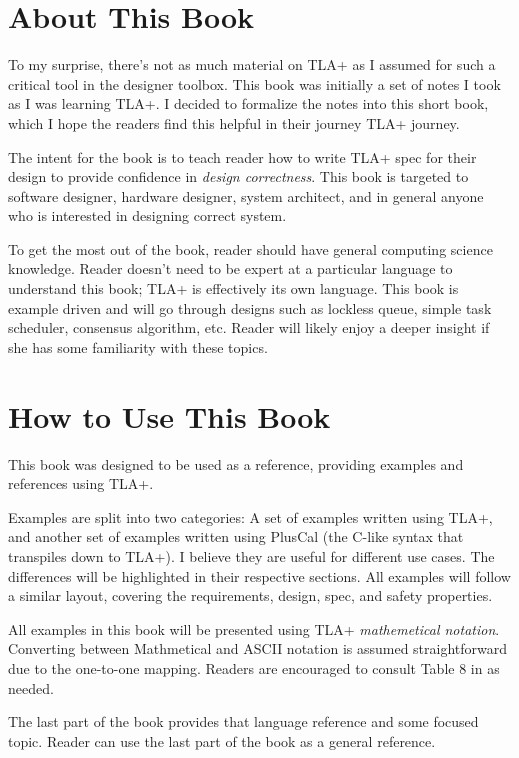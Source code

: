 \section{About This Book}

To my surprise, there's not as much material on TLA+ as I assumed for such a
critical tool in the designer toolbox. This book was initially a set of notes I
took as I was learning TLA+. I decided to formalize the notes into this short
book, which I hope the readers find this helpful in their journey TLA+
journey.\newline

The intent for the book is to teach reader how to write TLA+ spec for their
design to provide confidence in \textit{design correctness}. This book is
targeted to software designer, hardware designer, system architect, and in
general anyone who is interested in designing correct system.\newline 

To get the most out of the book, reader should have general computing science
knowledge. Reader doesn't need to be expert at a particular language to
understand this book; TLA+ is effectively its own language. This book is example
driven and will go through designs such as lockless queue, simple task
scheduler, consensus algorithm, etc. Reader will likely enjoy a deeper insight
if she has some familiarity with these topics.

\section{How to Use This Book}

This book was designed to be used as a reference, providing examples and
references using TLA+.\newline

Examples are split into two categories: A set of examples written using TLA+,
and another set of examples written using PlusCal (the C-like syntax that
transpiles down to TLA+). I believe they are useful for different use cases.
The differences will be highlighted in their respective sections. All examples
will follow a similar layout, covering the requirements, design, spec, and 
safety properties.\newline

All examples in this book will be presented using TLA+ \textit{mathemetical
notation}. Converting between Mathmetical and ASCII notation is assumed
straightforward due to the one-to-one mapping. Readers are encouraged to consult
Table 8 in \cite{ss} as needed.\newline

The last part of the book provides that language reference and some focused
topic. Reader can use the last part of the book as a general reference. 

